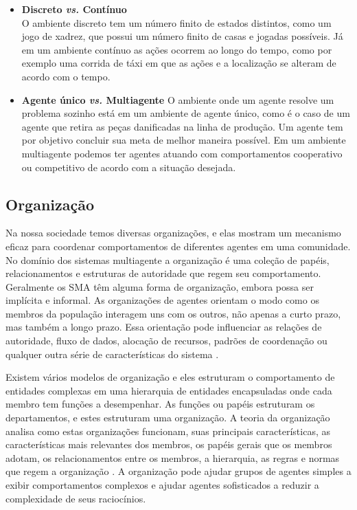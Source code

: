\begin{itemize}
\item \textbf{Discreto \textit{vs.} Contínuo} \\
O ambiente discreto tem um número finito de estados distintos, como um jogo de xadrez, que possui um número finito de casas e jogadas possíveis. Já em um ambiente contínuo as ações ocorrem ao longo do tempo, como por exemplo uma corrida de táxi em que as ações e a localização se alteram de acordo com o tempo.

\item \textbf{Agente único \textit{vs.} Multiagente}
O ambiente onde um agente resolve um problema sozinho está em um ambiente de agente único, como é o caso de um  agente que retira as peças danificadas na linha de produção. Um agente tem por objetivo concluir sua meta de melhor maneira possível. Em um ambiente multiagente podemos ter agentes atuando com comportamentos cooperativo ou competitivo de acordo com a situação desejada.
\end{itemize}

\subsection{Organização}\label{sec:orgsma}

Na nossa sociedade temos diversas organizações, e elas mostram um mecanismo eficaz para coordenar comportamentos de diferentes agentes em uma comunidade. No domínio dos sistemas multiagente a organização é uma coleção de papéis, relacionamentos e estruturas de autoridade que regem seu comportamento. Geralmente os SMA têm alguma forma de organização, embora possa ser implícita e informal. As organizações de agentes orientam o modo como os membros da população interagem uns com os outros, não apenas a curto prazo, mas também a longo prazo. Essa orientação pode influenciar as relações de autoridade, fluxo de dados, alocação de recursos, padrões de coordenação ou qualquer outra série de características do sistema \cite{horling2004survey}.

Existem vários modelos de organização e eles estruturam o comportamento de entidades complexas em uma hierarquia de entidades encapsuladas onde cada membro tem funções a desempenhar. As funções ou papéis estruturam os departamentos, e estes estruturam uma organização. A teoria da organização analisa como estas organizações funcionam, suas principais características, as características mais relevantes dos membros, os papéis gerais que os membros adotam, os relacionamentos entre os membros, a hierarquia, as regras e normas que regem a organização \cite{argente2006multi}. A organização pode ajudar grupos de agentes simples a exibir comportamentos complexos e ajudar agentes sofisticados a reduzir a complexidade de seus raciocínios.


